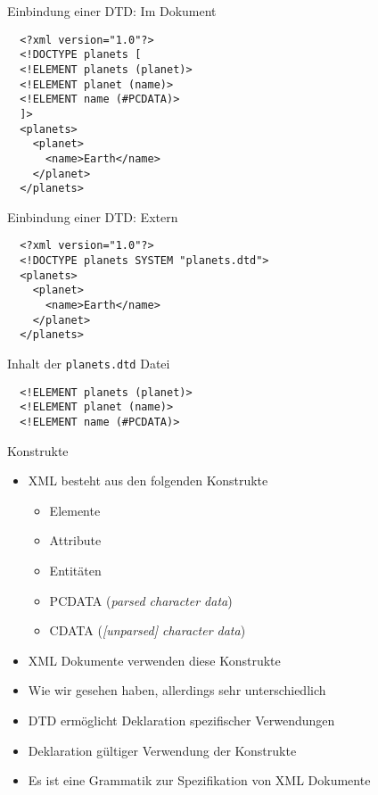 \documentclass{beamer}
\begin{document}
\begin{frame}[fragile]{Einbindung einer DTD: Im Dokument}
	
	\lstset{language=XML}
	\begin{lstlisting}	
  <?xml version="1.0"?>
  <!DOCTYPE planets [
  <!ELEMENT planets (planet)>
  <!ELEMENT planet (name)>
  <!ELEMENT name (#PCDATA)>
  ]>
  <planets>
    <planet>
      <name>Earth</name>
    </planet>
  </planets>		
	\end{lstlisting}

\end{frame}

\begin{frame}[fragile]{Einbindung einer DTD: Extern}
	
	\lstset{language=XML}
	\begin{lstlisting}	
  <?xml version="1.0"?>
  <!DOCTYPE planets SYSTEM "planets.dtd">
  <planets>
    <planet>
      <name>Earth</name>
    </planet>
  </planets>		
	\end{lstlisting}
	
  \vspace{1cm}

  Inhalt der \texttt{planets.dtd} Datei
	
	\begin{lstlisting}
  <!ELEMENT planets (planet)>
  <!ELEMENT planet (name)>
  <!ELEMENT name (#PCDATA)>
	\end{lstlisting}

\end{frame}

\begin{frame}{Konstrukte}
	
	\begin{itemize}
		\item XML besteht aus den folgenden Konstrukte
		\begin{itemize}
			\item Elemente
			\item Attribute
			\item Entitäten
			\item PCDATA (\emph{parsed character data})
			\item CDATA (\emph{[unparsed] character data})
		\end{itemize}
		\item XML Dokumente verwenden diese Konstrukte
		\item Wie wir gesehen haben, allerdings sehr unterschiedlich
		\item DTD ermöglicht Deklaration spezifischer Verwendungen
		\item Deklaration gültiger Verwendung der Konstrukte
		\item Es ist eine Grammatik zur Spezifikation von XML Dokumente
	\end{itemize}
	
\end{frame}
\end{document}
